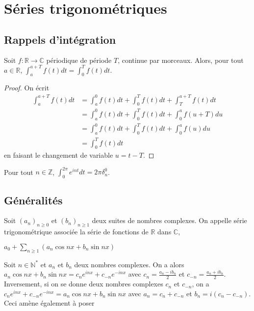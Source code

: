 

\section{Séries trigonométriques}

\subsection{Rappels d'intégration}
\smallskip
\begin{lem}
Soit $f : \mathbb{R} \rightarrow \mathbb{C}$ périodique de période $T$, continue par
morceaux. Alors, pour tout $a \in \mathbb{R}$, $\int_a^{a+T} f(t) dt = \int_0^T f(t) dt$.
\end{lem}

\begin{proof}
On écrit 
\begin{align*}
\int_a^{a+T} f(t) dt &= \int_a^0 f(t) dt + \int_0^T f(t) dt + \int_T^{a+T} f(t) dt \\
&= \int_a^0 f(t) dt + \int_0^T f(t) dt + \int_0^a f(u+T) du \\
&= \int_a^0 f(t) dt + \int_0^T f(t) dt + \int_0^a f(u) du \\
&= \int_0^T f(t) dt
\end{align*}
en faisant le changement de variable $u = t - T$.
\end{proof}

\begin{lem}
Pour tout $n \in \mathbb{Z}$, $\int_0^{2\pi} e^{int} dt = 2\pi \delta_n^0$.
\end{lem}

\subsection{Généralités}

\begin{de}
Soit $(a_n)_{n \geq 0}$ et
$(b_n)_{n \geq 1}$ deux suites de nombres complexes. On appelle
série trigonométrique associée la série de fonctions de $\mathbb{R}$ dans $\mathbb{C}$,

$a_0 + \sum_{n \geq 1} (a_n \cos nx + b_n \sin nx)$
\end{de}

\begin{rem}
Soit $n \in \mathbb{N}^*$ et $a_n$ et $b_n$
deux nombres complexes. On a alors 
$a_n \cos nx + b_n \sin nx = c_n e^{inx} + c_{-n} e^{-inx}$ 
avec
$c_n = \frac{a_n - ib_n}{2}$ et
$c_{-n} = \frac{a_n + ib_n}{2}$.
Inversement, si on se donne deux nombres complexes $c_n$ et
$c_{-n}$, on a $c_n e^{inx} + c_{-n} e^{-inx} = a_n \cos nx + b_n \sin nx$ avec
$a_n = c_n + c_{-n}$ et $b_n = i(c_n - c_{-n})$. Ceci amène également à poser
\end{rem}

